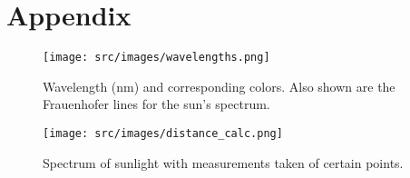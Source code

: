 \section{Appendix}
        
    \begin{figure}[H]
        \centering
        \texttt{[image: src/images/wavelengths.png]}
        \caption{Wavelength (nm) and corresponding colors. Also shown are the Frauenhofer lines for the sun's spectrum.}
        \label{fig_wavelengths}
    \end{figure}

    \begin{figure}[H]
        \centering
        \texttt{[image: src/images/distance\_calc.png]}
        \caption{Spectrum of sunlight with measurements taken of certain points.}
        \label{fig_sunlight}
    \end{figure}
    